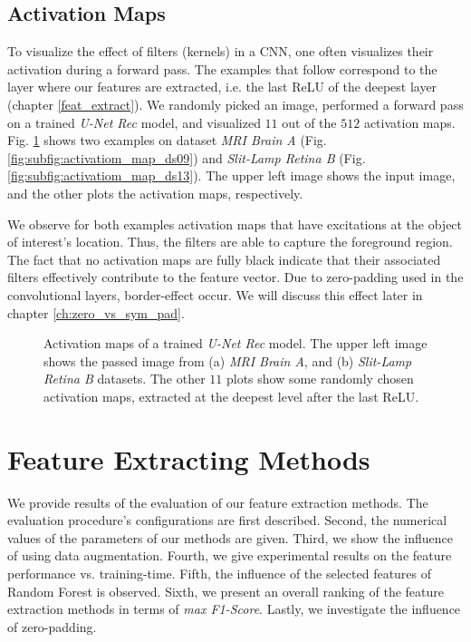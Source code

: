 \clearpage
\subsection{Activation Maps} \label{ch:act_maps}
To visualize the effect of filters (kernels) in a CNN, one often visualizes their activation during a forward pass.
The examples that follow correspond to the layer where our features are extracted, i.e. the last ReLU of the deepest layer (chapter \ref{feat_extract}). We randomly picked an image, performed a forward pass on a trained \textit{U-Net Rec} model, and visualized $11$ out of the $512$ activation maps. Fig. \ref{fig:activatiom_maps} shows two examples on dataset \textit{MRI Brain A} (Fig. \ref{fig:subfig:activatiom_map_ds09}) and \textit{Slit-Lamp Retina B} (Fig. \ref{fig:subfig:activatiom_map_ds13}). The upper left image shows the input image, and the other plots the activation maps, respectively.

We observe for both examples activation maps that have excitations at the object of interest's location. Thus, the filters are able to capture the foreground region. The fact that no activation maps are fully black indicate that their associated filters effectively contribute to the feature vector. Due to zero-padding used in the convolutional layers, border-effect occur. We will discuss this effect later in chapter \ref{ch:zero_vs_sym_pad}.
\vspace{30pt}

\begin{figure}[!htbp]
  \centering
  \hfill
  \caption[Activation maps]{Activation maps of a trained \textit{U-Net Rec} model. The upper left image shows the passed image from (a) \textit{MRI Brain A}, and (b) \textit{Slit-Lamp Retina B} datasets. The other $11$ plots show some randomly chosen activation maps, extracted at the deepest level after the last ReLU.}
  \label{fig:activatiom_maps}
\end{figure}

\clearpage
\section{Feature Extracting Methods}
We provide results of the evaluation of our feature extraction methods. The evaluation procedure's configurations are first described. Second, the numerical values of the parameters of our methods are given. Third, we show the influence of using data augmentation. Fourth, we give experimental results on the feature performance vs. training-time. Fifth, the influence of the selected features of Random Forest is observed. Sixth, we present an overall ranking of the feature extraction methods in terms of \textit{max F1-Score}. Lastly, we investigate the influence of zero-padding.

